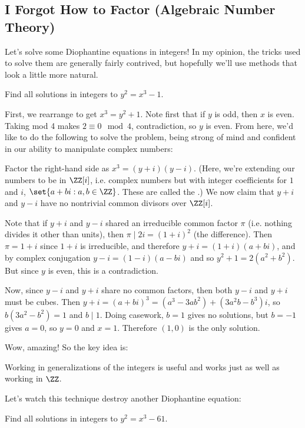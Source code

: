 \documentclass[12pt]{article}
\begin{document}
\subsection{I Forgot How to Factor (Algebraic Number Theory)}
Let's solve some Diophantine equations in integers! In my opinion, the tricks
used to solve them are generally fairly contrived, but hopefully we'll use
methods that look a little more natural.   
\begin{problem}
  Find all solutions in integers to $y^2 = x^3 -1$. 
\end{problem}
\begin{solution}
 First, we rearrange to get $x^3 = y^2 + 1$. Note first that if $y$ is odd, then
 $x$ is even. Taking mod 4 makes $2 \equiv 0 \mod 4$, contradiction, so $y$ is
 even. From here, we'd like to do the following to solve the problem, being
 strong of mind and confident in our ability to manipulate complex numbers:

 Factor the right-hand side as $x^3 = (y+i)(y-i)$. (Here, we're extending our
 numbers to be in $\ZZ[i]$, i.e. complex numbers but with integer
 coefficients for $1$ and $i$, $\set{a + bi : a, b \in \ZZ}$. These are called
 the .) We now claim that $y + i$ and $y-i$ have no
 nontrivial common divisors over $\ZZ[i]$.

 Note that if $y + i$ and $y - i$ shared an irreducible common factor $\pi$
 (i.e. nothing divides it other than units), then $\pi \mid 2i = (1 + i)^2$ (the
 difference). Then $\pi = 1 + i$ since $1 + i$ is irreducible, and therefore $y+
 i = (1 + i)(a + bi)$, and by complex conjugation $y - i = (1-i) (a-bi)$ and so
 $y^2 + 1 = 2 (a^2 + b^2)$. But since $y$ is even, this is a contradiction.

 Now, since $y-i$ and $y+i$ share no common factors, then both $y-i$ and $y+i$
 must be cubes. Then $y + i = (a+bi)^3 = (a^3 - 3ab^2) + (3a^2b - b^3)i$, so
 $b(3a^2 - b^2) = 1$ and $b \mid 1$. Doing casework, $b = 1$ gives no solutions, but $b = -1$
 gives $a = 0$, so $y = 0$ and $x = 1$. Therefore $(1, 0)$ is the only solution.
\end{solution}
\noindent Wow, amazing! So the key idea is: 
\begin{idea}[partial]
  Working in generalizations of the integers is useful and works just as well
  as working in $\ZZ$.  
\end{idea}
Let's watch this technique destroy another Diophantine equation:
\begin{problem}
  Find all solutions in integers to $y^2 = x^3 - 61$. 
\end{problem}
\end{document}
